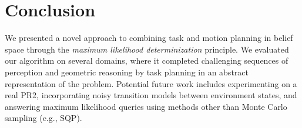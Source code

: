 \section{Conclusion}
We presented a novel approach to combining task and motion planning
in belief space through the \emph{maximum likelihood determinization}
principle. We evaluated our algorithm on several domains, where it completed
challenging sequences of perception and geometric reasoning by task planning in
an abstract representation of the problem. Potential future work includes experimenting on a real PR2, incorporating noisy transition models between environment states, and answering maximum likelihood queries using methods other than Monte Carlo sampling (e.g., SQP).